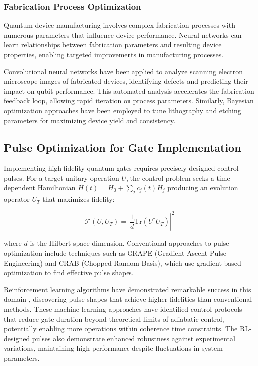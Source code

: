 \subsubsection{Fabrication Process Optimization}

Quantum device manufacturing involves complex fabrication processes with numerous parameters that influence device performance. Neural networks can learn relationships between fabrication parameters and resulting device properties, enabling targeted improvements in manufacturing processes.

Convolutional neural networks have been applied to analyze scanning electron microscope images of fabricated devices, identifying defects and predicting their impact on qubit performance. This automated analysis accelerates the fabrication feedback loop, allowing rapid iteration on process parameters. Similarly, Bayesian optimization approaches have been employed to tune lithography and etching parameters for maximizing device yield and consistency.

\subsection{Pulse Optimization for Gate Implementation}

Implementing high-fidelity quantum gates requires precisely designed control pulses. For a target unitary operation $U$, the control problem seeks a time-dependent Hamiltonian $H(t) = H_0 + \sum_j c_j(t) H_j$ producing an evolution operator $U_T$ that maximizes fidelity:

\begin{equation}
\mathcal{F}(U, U_T) = \left|\frac{1}{d}\text{Tr}(U^\dagger U_T)\right|^2
\end{equation}

where $d$ is the Hilbert space dimension. Conventional approaches to pulse optimization include techniques such as GRAPE (Gradient Ascent Pulse Engineering) and CRAB (Chopped Random Basis), which use gradient-based optimization to find effective pulse shapes.

Reinforcement learning algorithms have demonstrated remarkable success in this domain \cite{ding2021breaking}, discovering pulse shapes that achieve higher fidelities than conventional methods. These machine learning approaches have identified control protocols that reduce gate duration beyond theoretical limits of adiabatic control, potentially enabling more operations within coherence time constraints. The RL-designed pulses also demonstrate enhanced robustness against experimental variations, maintaining high performance despite fluctuations in system parameters.

